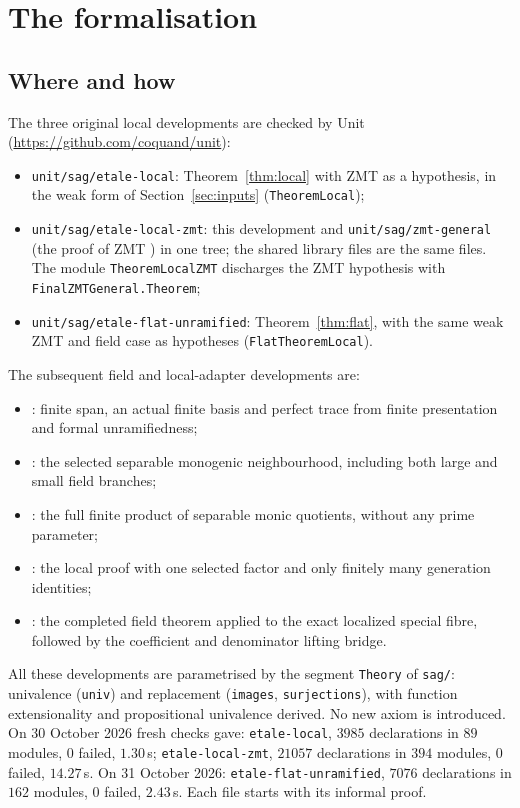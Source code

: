 \documentclass[11pt]{amsart}
\numberwithin{equation}{section}
\theoremstyle{definition}
\theoremstyle{remark}
\newcommand{\code}[1]{\texttt{#1}}
\begin{document}
\section{The formalisation}\label{sec:formal}

\subsection{Where and how}
The three original local developments are checked by Unit
(\url{https://github.com/coquand/unit}):
\begin{itemize}
\item \code{unit/sag/etale-local}: Theorem~\ref{thm:local} with ZMT as a
hypothesis, in the weak form of Section~\ref{sec:inputs}
(\code{TheoremLocal});
\item \code{unit/sag/etale-local-zmt}: this development and
\code{unit/sag/zmt-general} (the proof of ZMT \cite{ZMT}) in one tree;
the shared library files are the same files. The module
\code{TheoremLocalZMT} discharges the ZMT hypothesis with
\code{FinalZMTGeneral.Theorem};
\item \code{unit/sag/etale-flat-unramified}: Theorem~\ref{thm:flat},
with the same weak ZMT and field case as hypotheses
(\code{FlatTheoremLocal}).
\end{itemize}
The subsequent field and local-adapter developments are:
\begin{itemize}
\item {}: finite span, an actual finite basis
and perfect trace from finite presentation and formal unramifiedness;
\item {}: the selected separable
monogenic neighbourhood, including both large and small field branches;
\item {}: the full finite product of
separable monic quotients, without any prime parameter;
\item {}: the local proof with
one selected factor and only finitely many generation identities;
\item {}: the completed field
theorem applied to the exact localized special fibre, followed by the
coefficient and denominator lifting bridge.
\end{itemize}
All these developments are parametrised by the segment \code{Theory} of \code{sag/}:
univalence (\code{univ}) and replacement (\code{images},
\code{surjections}), with function extensionality and propositional
univalence derived. No new axiom is introduced. On 30 October 2026 fresh
checks gave: \code{etale-local}, $3985$ declarations in $89$ modules,
$0$ failed, $1.30$\,s; \code{etale-local-zmt}, $21057$ declarations in
$394$ modules, $0$ failed, $14.27$\,s. On 31 October 2026:
\code{etale-flat-unramified}, $7076$ declarations in $162$ modules,
$0$ failed, $2.43$\,s. Each file starts with its informal proof.
\end{document}
